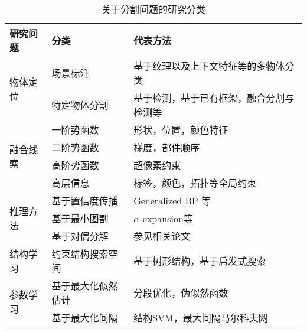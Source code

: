 \begin{table}[h]
\centering
\begin{minipage}[t]{0.9\linewidth}
  \caption{关于分割问题的研究分类}
  \label{tab:seg_research}
  \begin{tabular*}{\linewidth}{p{2cm}|p{3.5cm}|p{6.7cm}}
  \toprule[1.5pt]
  研究问题 & 分类 & 代表方法 \\
  \hline
  \hline
  \multirow{2}{*}{物体定位} & 场景标注 & 基于纹理以及上下文特征等的多物体分类\\ \cline{2-3}
   & 特定物体分割 & 基于检测，基于已有框架，融合分割与检测等 \\
  \hline
  \hline
  \multirow{4}{*}{融合线索} & 一阶势函数 & 形状，位置，颜色特征 \\ \cline{2-3}
   & 二阶势函数 & 梯度，部件顺序~\cite{layoutcrf} \\ \cline{2-3}
   & 高阶势函数 & 超像素约束 \\ \cline{2-3}
   & 高层信息 & 标签，颜色，拓扑等全局约束 \\
  \hline
  \hline
  \multirow{3}{*}{推理方法} & 基于置信度传播~\cite{bp} & Generalized BP 等 \\ \cline{2-3}
  & 基于最小图割~\cite{fastgc} & $\alpha$-expansion等 \\ \cline{2-3}
  & 基于对偶分解~\cite{dualdecomp} & 参见相关论文~\cite{conncut}\cite{beyondpw}\cite{beyondlp}\cite{jointsegapp} \\
  \hline
  \hline
  \multirow{1}{*}{结构学习} & 约束结构搜索空间 & 基于树形结构，基于启发式搜索\\ \cline{2-3}
  \hline
  \hline
  \multirow{2}{*}{参数学习} & 基于最大化似然估计 & 分段优化，伪似然函数 \\ \cline{2-3}
  & 基于最大化间隔 & 结构SVM，最大间隔马尔科夫网 \\
  \bottomrule[1.5pt]
  \end{tabular*}
\end{minipage}
\end{table}

